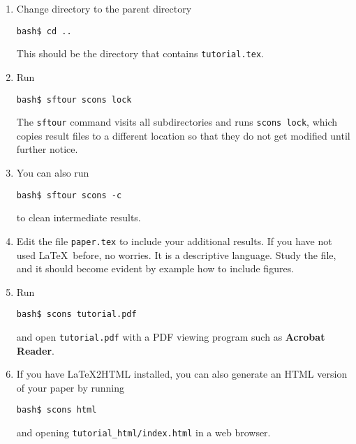 \begin{enumerate}
\item Change directory to the parent directory
\begin{verbatim}
bash$ cd ..
\end{verbatim}
This should be the directory that contains \texttt{tutorial.tex}.
\item Run
\begin{verbatim}
bash$ sftour scons lock
\end{verbatim}
The \texttt{sftour} command visits all subdirectories and runs \texttt{scons lock}, which copies result files to a different location so that they do not get modified until further notice.
\item You can also run
\begin{verbatim}
bash$ sftour scons -c
\end{verbatim}
to clean intermediate results.
\item Edit the file \texttt{paper.tex} to include your additional results. If you have not used \LaTeX\ before, no worries. It is a descriptive language. Study the file, and it should become evident by example how to include figures.
\item Run
\begin{verbatim}
bash$ scons tutorial.pdf
\end{verbatim}
and open \texttt{tutorial.pdf} with a PDF viewing program such as \textbf{Acrobat Reader}. 

\item If you have \LaTeX2HTML installed, you can also generate an HTML version of your paper by running
\begin{verbatim}
bash$ scons html
\end{verbatim}
and opening \verb#tutorial_html/index.html# in a web browser.
\end{enumerate}

%







